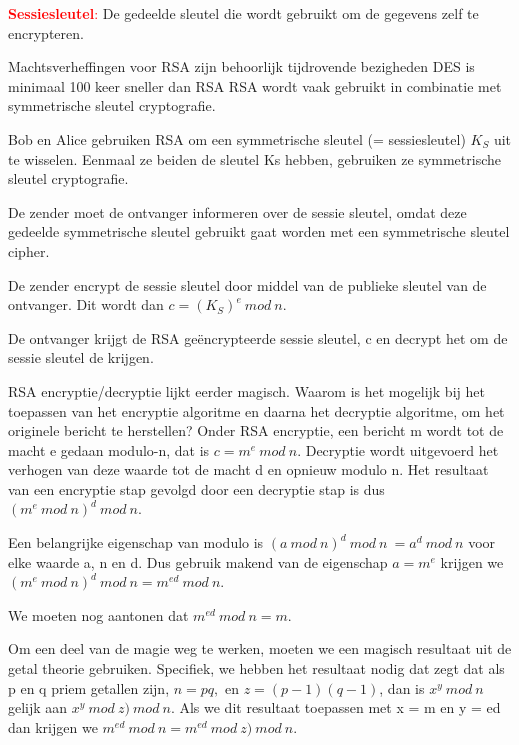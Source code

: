 
\textcolor{red}{\textbf{Sessiesleutel}:} De gedeelde sleutel die wordt gebruikt om de gegevens zelf te encrypteren.

\bi
\itf Machtsverheffingen voor RSA zijn behoorlijk tijdrovende bezigheden
\itf DES is minimaal 100 keer sneller dan RSA
\ei
RSA wordt vaak gebruikt in combinatie met symmetrische sleutel cryptografie.

\noindent Bob en Alice gebruiken RSA om een symmetrische sleutel (= sessiesleutel) $K_S$ uit te wisselen. Eenmaal ze beiden de sleutel Ks hebben, gebruiken ze symmetrische sleutel cryptografie.

\noindent De zender moet de ontvanger informeren over de sessie sleutel, omdat deze gedeelde symmetrische sleutel gebruikt gaat worden met een symmetrische sleutel cipher.

\noindent De zender encrypt de sessie sleutel door middel van de publieke sleutel van de ontvanger. Dit wordt dan $c = (K_S)^e\ mod\ n$.

\noindent De ontvanger krijgt de RSA geëncrypteerde sessie sleutel, c en decrypt het om de sessie sleutel de krijgen.

\newpage


RSA encryptie/decryptie lijkt eerder magisch. Waarom is het mogelijk bij het toepassen van het encryptie algoritme en daarna het decryptie algoritme, om het originele bericht te herstellen? 
Onder RSA encryptie, een bericht m wordt tot de macht e gedaan modulo-n, dat is $c = m^e\ mod\ n$.
Decryptie wordt uitgevoerd het verhogen van deze waarde tot de macht d en opnieuw modulo n. Het resultaat van een encryptie stap gevolgd door een decryptie stap is dus $(m^e\ mod\ n)^d\ mod\ n$.

\noindent Een belangrijke eigenschap van modulo is $(a\ mod\ n)^d\ mod\ n\ = a^d\ mod\ n$ voor elke waarde a, n en d. Dus gebruik makend van de eigenschap $a = m^e$ krijgen we $(m^e\ mod\ n)^d\ mod\ n = m^{ed}\ mod\ n$.

\noindent We moeten nog aantonen dat $m^{ed}\ mod\ n = m$.

\noindent Om een deel van de magie weg te werken, moeten we een magisch resultaat uit de getal theorie gebruiken. Specifiek, we hebben het resultaat nodig dat zegt dat als p en q priem getallen zijn, $n = pq, $ en $ z = (p - 1)(q - 1)$, dan is $x^y\ mod\ n$ gelijk aan $x^{y}\ mod\ z) \ mod\ n$. Als we dit resultaat toepassen met x = m en y = ed dan krijgen we $m^{ed}\ mod\ n = m^{ed}\ mod\ z) \ mod\ n$.

